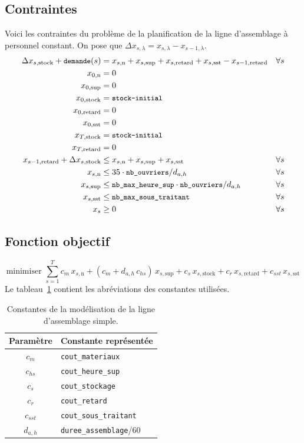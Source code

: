 \documentclass[12pt,oneside,a4paper]{article}
\newcommand{\myX}[2]{x_{#1,\text{#2}}}
\newcommand{\xSemaine}[1]{\myX{s}{#1}}
\newcommand{\xn}{\xSemaine{n}}
\newcommand{\xsup}{\xSemaine{sup}}
\newcommand{\xstock}{\xSemaine{stock}}
\newcommand{\xretard}{\xSemaine{retard}}
\newcommand{\xsst}{\xSemaine{sst}}
\newcommand{\texttts}[1]{{\small\texttt{#1}}}
\begin{document}
\subsection*{Contraintes}
Voici les contraintes du problème de la planification 
de la ligne d’assemblage à personnel constant.
On pose que $\Delta x_{s,\lambda} = x_{s,\lambda} - x_{s-1,\lambda}$.
\begin{align*}
  \Delta\xstock + \texttts{demande}(s) &= \xn + \xsup 
  + \xretard + \xsst - \myX{s-1}{retard} &\forall s \\
  \myX{0}{n}&= 0 \\
  \myX{0}{sup}&= 0 \\
  \myX{0}{stock} &= \texttts{stock-initial} \\
  \myX{0}{retard}&= 0 \\
  \myX{0}{sst}&= 0 \\
  \myX{T}{stock} &= \texttts{stock-initial} \\
  \myX{T}{retard}&= 0 \\
  \myX{s-1}{retard} + \Delta\xstock &\leq \xn + \xsup + \xsst &\forall s \\
  \xn &\leq 35\cdot \texttts{nb\_ouvriers}/ d_{a,h}
  &\forall s \\
  \xsup &\leq \texttts{nb\_max\_heure\_sup}\cdot\texttts{nb\_ouvriers}/ d_{a,h}
  &\forall s \\
  \xsst &\leq \texttts{nb\_max\_sous\_traitant} &\forall s \\
  x_s &\geq 0 &\forall s
\end{align*}

\subsection*{Fonction objectif}
\[
  \mbox{minimiser } 
  \sum_{s=1}^{T} 
  c_m\, \xn + (c_m + d_{a,h} \, c_{hs})\, \xsup
  + c_s\, \xstock + c_r\, \xretard + c_{sst}\, \xsst
\]
Le tableau~\ref{tab:constantesQuestion1} contient les abréviations
des constantes utilisées.
\begin{table}[h]
  \begin{center}
  \begin{tabular}{|c|l|}
    \hline
    Paramètre & Constante représentée \\
    \hline
    \hline
    $c_m$ & \texttt{cout\_materiaux} \\
    \hline
    $c_{hs}$ & \texttt{cout\_heure\_sup} \\
    \hline
    $c_s$ & \texttt{cout\_stockage} \\
    \hline
    $c_r$ & \texttt{cout\_retard} \\
    \hline
    $c_{sst}$ & \texttt{cout\_sous\_traitant} \\
    \hline
    $d_{a,h}$ & \texttt{duree\_assemblage}/60 \\
    \hline
  \end{tabular}
  \caption{Constantes de la modélisation de la ligne d'assemblage simple.}
  \label{tab:constantesQuestion1}
  \end{center}
\end{table}
\end{document}
